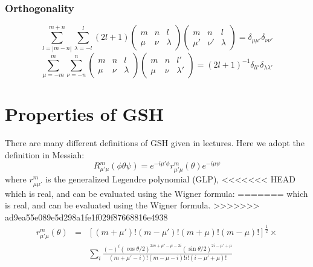 \subsubsection*{Orthogonality}

\begin{equation}
\sum_{l=\left|m-n\right|}^{m+n}\sum_{\lambda=-l}^{l}\left(2l+1\right)\left(\begin{array}{ccc}
m & n & l\\
\mu & \nu & \lambda
\end{array}\right)\left(\begin{array}{ccc}
m & n & l\\
\mu' & \nu' & \lambda
\end{array}\right)=\delta_{\mu\mu'}\delta_{\nu\nu'}\label{eq:3j-orthogonality}
\end{equation}
\begin{equation}
\sum_{\mu=-m}^{m}\sum_{\nu=-n}^{n}\left(\begin{array}{ccc}
m & n & l\\
\mu & \nu & \lambda
\end{array}\right)\left(\begin{array}{ccc}
m & n & l'\\
\mu & \nu & \lambda'
\end{array}\right)=\left(2l+1\right)^{-1}\delta_{ll'}\delta_{\lambda\lambda'}
\end{equation}



\section{Properties of GSH}

There are many different definitions of GSH given in lectures. Here
we adopt the definition in Messiah:
\begin{equation}
R_{\mu'\mu}^{m}(\phi\theta\psi)=e^{-i\mu'\phi}r_{\mu'\mu}^{m}(\theta)e^{-i\mu\psi}
\end{equation}
where $r_{\mu\mu'}^{m}$ is the generalized Legendre polynomial (GLP),
<<<<<<< HEAD
which is real, and can be evaluated using the Wigner formula:
=======
which is real, and can be evaluated using the Wigner formula.
>>>>>>> ad9ea55e089e5d298a1fe1f029f87668816e4938
\begin{eqnarray}
r_{\mu'\mu}^{m}(\theta) & = & \left[\left(m+\mu'\right)!\left(m-\mu'\right)!\left(m+\mu\right)!\left(m-\mu\right)!\right]^{\frac{1}{2}}\times\nonumber \\
 &  & \sum_{i}\frac{\left(-\right)^{i}\left(\cos\theta/2\right)^{2m+\mu'-\mu-2i}\left(\sin\theta/2\right)^{2i-\mu'+\mu}}{\left(m+\mu'-i\right)!\left(m-\mu-i\right)!i!\left(i-\mu'+\mu\right)!}
\end{eqnarray}



